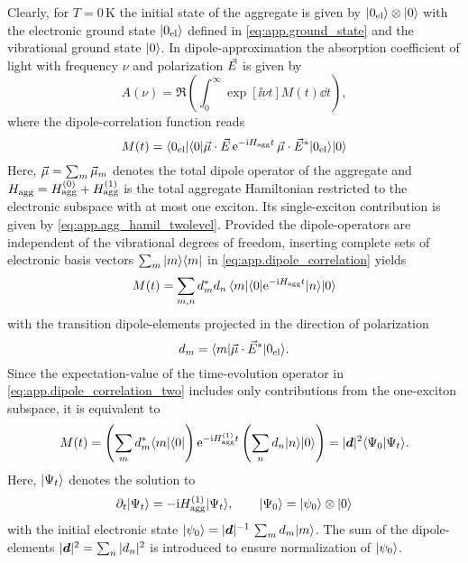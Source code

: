 Clearly, for $T = 0\,\mathrm{K}$ the initial state of the aggregate is given by $| 0_\mathrm{el} \rangle\otimes| 0 \rangle$ with the electronic ground state $| 0_\mathrm{el} \rangle$ defined in \autoref{eq:app.ground_state} and the vibrational ground state $| 0 \rangle$.
In dipole-approximation the absorption coefficient of light with frequency $\nu$ and polarization $\rvec{E}$ is given by \cite{MaKu11_dynamics}
\begin{equation}
  A(\nu) = \Re \left( \int_0^\infty \exp[\ii\nu t] M(t) \dd t \right),
  \label{eq:app.absorption}
\end{equation}
where the dipole-correlation function reads
\begin{equation}
  M(t) = \bra{0_\mathrm{el}}\bra{0} \rvec\mu\cdot\rvec{E} \, \exp[-\ii \opH{agg} t] \, \rvec\mu\cdot\cc{\rvec{E}} \ket{0_\mathrm{el}}\ket{0}
  \label{eq:app.dipole_correlation}
\end{equation}
Here, $\rvec\mu = \sum_m \rvec\mu_m$ denotes the total dipole operator of the aggregate and $H_\mathrm{agg} = H_\mathrm{agg}^{(0)} + H_\mathrm{agg}^{(1)}$ is the total aggregate Hamiltonian restricted to the electronic subspace with at most one exciton.
Its single-exciton contribution is given by \autoref{eq:app.agg_hamil_twolevel}.
Provided the dipole-operators are independent of the vibrational degrees of freedom, inserting complete sets of electronic basis vectors $\sum_m | m \rangle\langle m |$ in \autoref{eq:app.dipole_correlation} yields
\begin{equation}
  M(t) = \sum_{m,n} \cc{d}_m d_n \, \bra{m}\bra{0} \exp[-\ii \opH{agg} t] \ket{n} \ket{0}
  \label{eq:app.dipole_correlation_two}
\end{equation}
with the transition dipole-elements projected in the direction of polarization
\begin{equation*}
  d_m = \bra{m} \rvec\mu \cdot \cc{\rvec{E}} \ket{0_\mathrm{el}}.
\end{equation*}
Since the expectation-value of the time-evolution operator in \autoref{eq:app.dipole_correlation_two} includes only contributions from the one-exciton subspace, it is equivalent to
\begin{equation*}
  M(t) = \left(\sum_m \cc{d}_m \bra{m}\bra{0} \right) \exp[-\ii \opH{agg}^{(1)} t] \left(\sum_n d_n \ket{n}\ket{0} \right) = \abs{\vec{d}}^2 \braket{\Psi_0}{\Psi_t}.
\end{equation*}
Here, $| \Psi_t \rangle$ denotes the solution to
\begin{equation}
  \partial_t | \Psi_t \rangle = -\mathrm{i} H_\mathrm{agg}^{(1)} | \Psi_t \rangle, \qquad | \Psi_0 \rangle = | \psi_0 \rangle\otimes| 0 \rangle
  \label{eq:app.eqom}
\end{equation}
with the initial electronic state $| \psi_0 \rangle = \vert \boldsymbol{d} \vert^{-1} \, \sum_m d_m | m \rangle$.
The sum of the dipole-elements $\vert \boldsymbol{d} \vert^2 = \sum_n \vert d_n \vert^2$ is introduced to ensure normalization of $| \psi_0 \rangle$.\\



